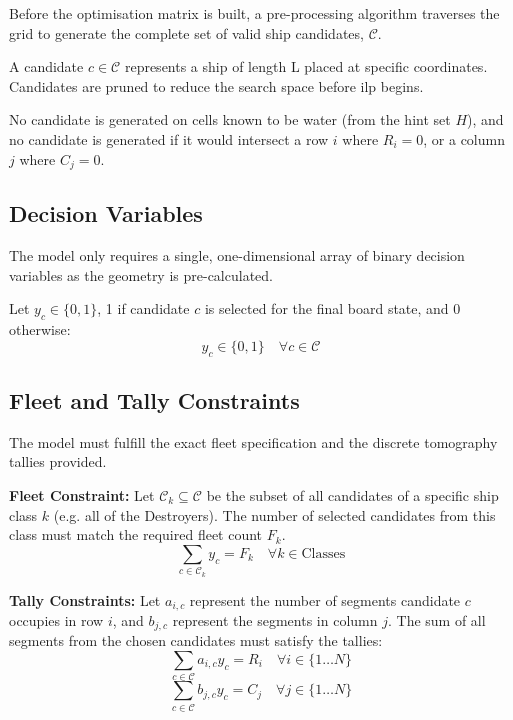 Before the optimisation matrix is built, a pre-processing algorithm traverses the grid to generate the complete set of valid ship candidates, $\mathcal{C}$.

A candidate $c \in \mathcal{C}$ represents a ship of length L placed at specific coordinates. Candidates are pruned to reduce the search space before \gls{ilp} begins.

No candidate is generated on cells known to be water (from the hint set $H$), and no candidate is generated if it would intersect a row $i$ where $R_i = 0$, or a column $j$ where $C_j = 0$.

\subsection{Decision Variables}\label{subsec:ship-decision-variables}

The model only requires a single, one-dimensional array of binary decision variables as the geometry is pre-calculated.

Let $y_c \in \{0, 1\}$, 1 if candidate $c$ is selected for the final board state, and 0 otherwise:
\begin{equation}
    y_c \in \{0, 1\} \quad \forall c \in \mathcal{C}
\end{equation}

\subsection{Fleet and Tally Constraints}\label{subsec:fleet-and-tally-constraints}

The model must fulfill the exact fleet specification and the discrete tomography tallies provided.

\textbf{Fleet Constraint:}
Let $\mathcal{C}_k \subseteq \mathcal{C}$ be the subset of all candidates of a specific ship class $k$ (e.g. all of the Destroyers). The number of selected candidates from this class must match the required fleet count $F_k$.
\begin{equation}
    \sum_{c \in \mathcal{C}_k} y_c = F_k \quad \forall k \in \text{Classes}
\end{equation}

\textbf{Tally Constraints:}
Let $a_{i,c}$ represent the number of segments candidate $c$ occupies in row $i$, and $b_{j,c}$ represent the segments in column $j$. The sum of all segments from the chosen candidates must satisfy the tallies:
\begin{equation}\label{eq:ship-row-tally}
    \sum_{c \in \mathcal{C}} a_{i,c} y_c = R_i \quad \forall i \in \{1 \dots N\}
\end{equation}
\begin{equation}\label{eq:ship-col-tally}
    \sum_{c \in \mathcal{C}} b_{j,c} y_c = C_j \quad \forall j \in \{1 \dots N\}
\end{equation}

